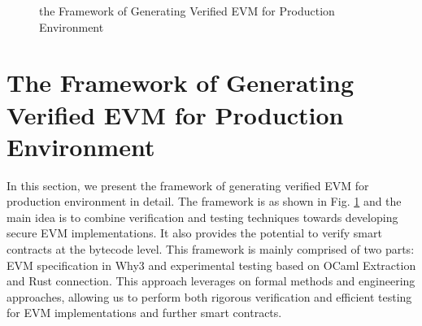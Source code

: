 \documentclass[runningheads]{llncs}
\begin{document}
\begin{figure}[t]
  \centering
  \caption{the Framework of Generating Verified EVM for Production Environment}
  \label{fig:evm1}
\end{figure}

\section{The Framework of Generating Verified EVM for Production Environment}\label{Sec: Framework}
In this section, we present the framework of generating verified EVM for production environment in detail. The framework is as shown in Fig. \ref{fig:evm1} and the main idea is to combine verification and testing techniques towards developing secure EVM implementations.
It also provides the potential to verify smart contracts at the bytecode level.  This framework is mainly comprised of two parts: EVM specification in Why3 and experimental testing based on OCaml Extraction and Rust connection. This approach leverages on formal methods and engineering approaches, allowing us to perform both rigorous verification and efficient testing for EVM implementations and further smart contracts. 
\end{document}
